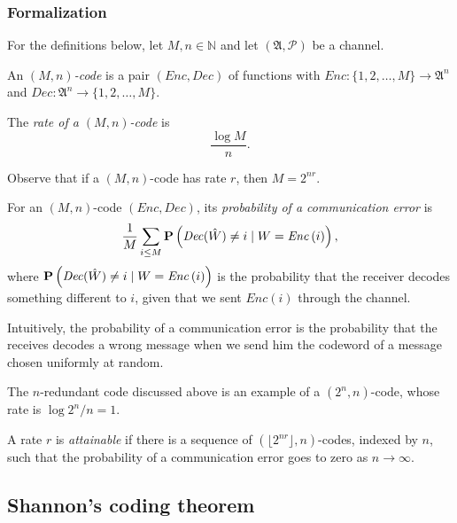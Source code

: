 \subsubsection*{Formalization}

For the definitions below, let $M, n \in \mathbb{N}$ and let $(\mathfrak{A}, \mathcal{P})$ be a channel.

\begin{definition}
An \emph{$(M, n)$-code} is a pair $(\mathit{Enc}, \mathit{Dec})$ of functions with $\mathit{Enc}: \{1, 2, \ldots, M\} \to \mathfrak{A}^n$ and $\mathit{Dec}: \mathfrak{A}^n \to \{1, 2, \ldots, M\}$.
\end{definition}

\begin{definition}
The \emph{rate of a $(M, n)$-code} is 
%
$$\frac{\log M}{n}.$$
%
\end{definition}

Observe that if a $(M, n)$-code has rate $r$, then $M = 2^{nr}$.

\begin{definition}
For an $(M, n)$-code $(\mathit{Enc}, \mathit{Dec})$,
its \emph{probability of a communication error} is
%
$$\frac{1}{M}\sum_{i \leq M} \mathbf{P}\left(\mathit{Dec}(\hat{W}) \neq i \mid W = \mathit{Enc}\left(i\right)\right),$$
%
where $\mathbf{P}\left(\mathit{Dec}(\hat{W}) \neq i \mid W = \mathit{Enc}\left(i\right)\right)$ is the probability that the receiver decodes something different to $i$, given that we sent $\mathit{Enc}\left(i\right)$ through the channel.
\end{definition}

Intuitively, the probability of a communication error is the probability that the receives decodes a wrong message when we send him the codeword of a message chosen uniformly at random.

\begin{example}
The $n$-redundant code discussed above is an example of a $(2^n, n)$-code, whose rate is $\log 2^n / n = 1$.
\end{example}

\begin{definition}
A rate $r$ is \emph{attainable} if there is a sequence of $\left(\lfloor2^{nr}\rfloor, n\right)$-codes, indexed by $n$, such that the probability of a communication error goes to zero as $n \to \infty$.
\end{definition}

\subsection{Shannon's coding theorem}

